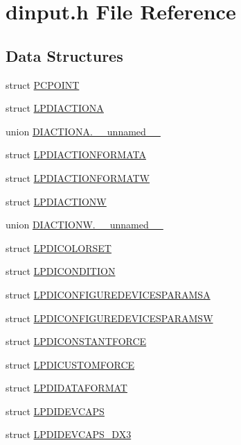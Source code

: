 \hypertarget{a00003}{\section{dinput.\-h File Reference}
\label{a00003}
}
\subsection*{Data Structures}
\begin{DoxyCompactItemize}
\item 
struct \hyperlink{a00003_d2/d79/a00051}{P\-C\-P\-O\-I\-N\-T}
\item 
struct \hyperlink{a00003_dc/dee/a00053}{L\-P\-D\-I\-A\-C\-T\-I\-O\-N\-A}
\item 
union \hyperlink{a00003_d1/dea/a00054}{D\-I\-A\-C\-T\-I\-O\-N\-A.\-\_\-\-\_\-unnamed\-\_\-\-\_\-}
\item 
struct \hyperlink{a00003_d4/d6d/a00055}{L\-P\-D\-I\-A\-C\-T\-I\-O\-N\-F\-O\-R\-M\-A\-T\-A}
\item 
struct \hyperlink{a00003_d9/d2e/a00056}{L\-P\-D\-I\-A\-C\-T\-I\-O\-N\-F\-O\-R\-M\-A\-T\-W}
\item 
struct \hyperlink{a00003_d1/d22/a00057}{L\-P\-D\-I\-A\-C\-T\-I\-O\-N\-W}
\item 
union \hyperlink{a00003_d7/df7/a00058}{D\-I\-A\-C\-T\-I\-O\-N\-W.\-\_\-\-\_\-unnamed\-\_\-\-\_\-}
\item 
struct \hyperlink{a00003_d3/d8b/a00059}{L\-P\-D\-I\-C\-O\-L\-O\-R\-S\-E\-T}
\item 
struct \hyperlink{a00003_d9/d73/a00060}{L\-P\-D\-I\-C\-O\-N\-D\-I\-T\-I\-O\-N}
\item 
struct \hyperlink{a00003_d4/de8/a00061}{L\-P\-D\-I\-C\-O\-N\-F\-I\-G\-U\-R\-E\-D\-E\-V\-I\-C\-E\-S\-P\-A\-R\-A\-M\-S\-A}
\item 
struct \hyperlink{a00003_df/d03/a00062}{L\-P\-D\-I\-C\-O\-N\-F\-I\-G\-U\-R\-E\-D\-E\-V\-I\-C\-E\-S\-P\-A\-R\-A\-M\-S\-W}
\item 
struct \hyperlink{a00003_d1/d6f/a00063}{L\-P\-D\-I\-C\-O\-N\-S\-T\-A\-N\-T\-F\-O\-R\-C\-E}
\item 
struct \hyperlink{a00003_df/d5f/a00064}{L\-P\-D\-I\-C\-U\-S\-T\-O\-M\-F\-O\-R\-C\-E}
\item 
struct \hyperlink{a00003_de/de1/a00065}{L\-P\-D\-I\-D\-A\-T\-A\-F\-O\-R\-M\-A\-T}
\item 
struct \hyperlink{a00003_d9/db3/a00066}{L\-P\-D\-I\-D\-E\-V\-C\-A\-P\-S}
\item 
struct \hyperlink{a00003_dc/ddf/a00067}{L\-P\-D\-I\-D\-E\-V\-C\-A\-P\-S\-\_\-\-D\-X3}

\end{DoxyCompactItemize}
